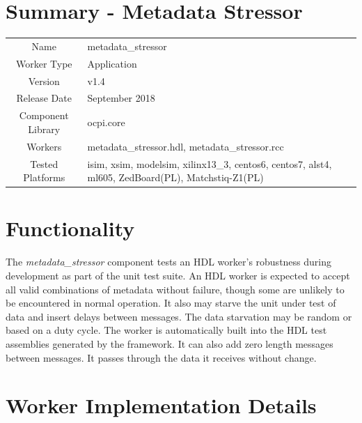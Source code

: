 \documentclass{article}
\author{} %
\date{Version \docVersion} %
\title{\docTitle}
\def\docVersion{1.4}
\def\comp{metadata\_stressor}
\def\Comp{Metadata Stressor}
\begin{document}
\section*{Summary - \Comp}
\begin{tabular}{|c|M{13.5cm}|}
	\hline
	                  &  \\
	\hline
	Name              & \comp  \\
	\hline
	Worker Type       & Application  \\
	\hline
	Version           &  v\docVersion  \\
	\hline
	Release Date      &  September 2018  \\
	\hline
	Component Library &  ocpi.core  \\
	\hline
	Workers           &  \comp.hdl, \comp.rcc  \\
	\hline
	Tested Platforms  &  isim, xsim, modelsim, xilinx13\_3, centos6, centos7, alst4, ml605, ZedBoard(PL), Matchstiq-Z1(PL)  \\
	\hline
\end{tabular}

\section*{Functionality}
\begin{flushleft}
The \textit{\comp} component tests an HDL worker's robustness during development as part of the unit test suite. An HDL worker is expected to accept all valid combinations of metadata without failure, though some are unlikely to be encountered in normal operation. It also may starve the unit under test of data and insert delays between messages. The data starvation may be random or based on a duty cycle. The worker is automatically built into the HDL test assemblies generated by the framework. It can also add zero length messages between messages. It passes through the data it receives without change.  \medskip
\end{flushleft}


\section*{Worker Implementation Details}
\end{document}
